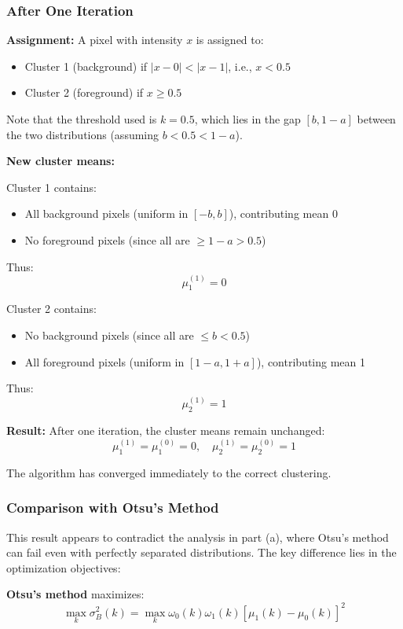 \documentclass[11pt,a4paper]{article}
\begin{document}
\subsubsection{After One Iteration}

\textbf{Assignment:} A pixel with intensity $x$ is assigned to:
\begin{itemize}
    \item Cluster 1 (background) if $|x - 0| < |x - 1|$, i.e., $x < 0.5$
    \item Cluster 2 (foreground) if $x \geq 0.5$
\end{itemize}

Note that the threshold used is $k = 0.5$, which lies in the gap $[b, 1-a]$ between the two distributions (assuming $b < 0.5 < 1-a$).

\textbf{New cluster means:}

Cluster 1 contains:
\begin{itemize}
    \item All background pixels (uniform in $[-b, b]$), contributing mean 0
    \item No foreground pixels (since all are $\geq 1-a > 0.5$)
\end{itemize}

Thus:
$$\mu_1^{(1)} = 0$$

Cluster 2 contains:
\begin{itemize}
    \item No background pixels (since all are $\leq b < 0.5$)
    \item All foreground pixels (uniform in $[1-a, 1+a]$), contributing mean 1
\end{itemize}

Thus:
$$\mu_2^{(1)} = 1$$

\textbf{Result:} After one iteration, the cluster means remain unchanged:
$$\mu_1^{(1)} = \mu_1^{(0)} = 0, \quad \mu_2^{(1)} = \mu_2^{(0)} = 1$$

The algorithm has converged immediately to the correct clustering.

\subsubsection{Comparison with Otsu's Method}

This result appears to contradict the analysis in part (a), where Otsu's method can fail even with perfectly separated distributions. The key difference lies in the optimization objectives:

\textbf{Otsu's method} maximizes:
$$\max_k \sigma_B^2(k) = \max_k \omega_0(k) \omega_1(k) [\mu_1(k) - \mu_0(k)]^2$$
\end{document}
